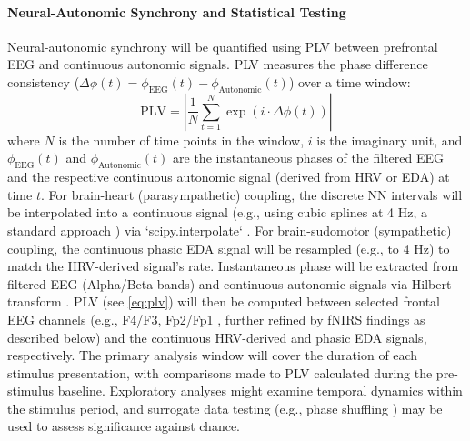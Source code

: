 \documentclass[12pt]{article} %
\begin{document}
\paragraph{Neural-Autonomic Synchrony and Statistical Testing} %
Neural-autonomic synchrony will be quantified using \gls{PLV} \parencite{lachauxMeasuringPhaseSynchrony1999} between prefrontal \gls{EEG} and continuous autonomic signals. \gls{PLV} measures the phase difference consistency ($\Delta\phi(t) = \phi_{\text{EEG}}(t) - \phi_{\text{Autonomic}}(t)$) over a time window:
\begin{equation}
    \text{PLV} = \left| \frac{1}{N} \sum_{t=1}^{N} \exp(i \cdot \Delta\phi(t)) \right|
    \label{eq:plv} %
\end{equation}
where $N$ is the number of time points in the window, $i$ is the imaginary unit, and $\phi_{\text{EEG}}(t)$ and $\phi_{\text{Autonomic}}(t)$ are the instantaneous phases of the filtered \gls{EEG} and the respective continuous autonomic signal (derived from \gls{HRV} or \gls{EDA}) at time $t$. For brain-heart (parasympathetic) coupling, the discrete \gls{NN intervals} will be interpolated into a continuous signal (e.g., using cubic splines at 4 Hz, a standard approach \parencite{lagunaPowerSpectralDensity1998, shafferOverviewHeartRate2017}) via `scipy.interpolate` \parencite{virtanenSciPy10Fundamental2020}. For brain-sudomotor (sympathetic) coupling, the continuous phasic \gls{EDA} signal will be resampled (e.g., to 4 Hz) to match the \gls{HRV}-derived signal's rate. Instantaneous phase will be extracted from filtered \gls{EEG} (Alpha/Beta bands) and continuous autonomic signals via Hilbert transform \parencite{virtanenSciPy10Fundamental2020}. \gls{PLV} (see \autoref{eq:plv}) will then be computed between selected frontal \gls{EEG} channels (e.g., F4/F3, Fp2/Fp1 \parencite{rodriguesMethodsMatterExamination2021}, further refined by \gls{fNIRS} findings as described below) and the continuous \gls{HRV}-derived and phasic \gls{EDA} signals, respectively. The primary analysis window will cover the duration of each stimulus presentation, with comparisons made to \gls{PLV} calculated during the pre-stimulus baseline. Exploratory analyses might examine temporal dynamics within the stimulus period, and surrogate data testing (e.g., phase shuffling \parencite{cohenAnalyzingNeuralTime2014}) may be used to assess significance against chance.
\end{document}

